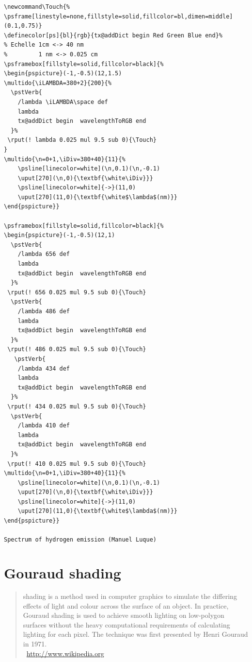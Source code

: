 \documentclass[11pt,english,BCOR=10mm,DIV=12,bibliography=totoc,parskip=false,headings=small,
    headinclude=false,footinclude=false,oneside]{pst-doc}
\begin{document}
\begin{lstlisting}
\newcommand\Touch{%
\psframe[linestyle=none,fillstyle=solid,fillcolor=bl,dimen=middle](0.1,0.75)}
\definecolor[ps]{bl}{rgb}{tx@addDict begin Red Green Blue end}%
% Echelle 1cm <-> 40 nm
%         1 nm <-> 0.025 cm
\psframebox[fillstyle=solid,fillcolor=black]{%
\begin{pspicture}(-1,-0.5)(12,1.5)
\multido{\iLAMBDA=380+2}{200}{%
  \pstVerb{
    /lambda \iLAMBDA\space def
    lambda
    tx@addDict begin  wavelengthToRGB end
  }%
 \rput(! lambda 0.025 mul 9.5 sub 0){\Touch}
}
\multido{\n=0+1,\iDiv=380+40}{11}{%
    \psline[linecolor=white](\n,0.1)(\n,-0.1)
    \uput[270](\n,0){\textbf{\white\iDiv}}}
    \psline[linecolor=white]{->}(11,0)
    \uput[270](11,0){\textbf{\white$\lambda$(nm)}}
\end{pspicture}}

\psframebox[fillstyle=solid,fillcolor=black]{%
\begin{pspicture}(-1,-0.5)(12,1)
  \pstVerb{
    /lambda 656 def
    lambda
    tx@addDict begin  wavelengthToRGB end
  }%
 \rput(! 656 0.025 mul 9.5 sub 0){\Touch}
  \pstVerb{
    /lambda 486 def
    lambda
    tx@addDict begin  wavelengthToRGB end
  }%
 \rput(! 486 0.025 mul 9.5 sub 0){\Touch}
   \pstVerb{
    /lambda 434 def
    lambda
    tx@addDict begin  wavelengthToRGB end
  }%
 \rput(! 434 0.025 mul 9.5 sub 0){\Touch}
  \pstVerb{
    /lambda 410 def
    lambda
    tx@addDict begin  wavelengthToRGB end
  }%
 \rput(! 410 0.025 mul 9.5 sub 0){\Touch}
\multido{\n=0+1,\iDiv=380+40}{11}{%
    \psline[linecolor=white](\n,0.1)(\n,-0.1)
    \uput[270](\n,0){\textbf{\white\iDiv}}}
    \psline[linecolor=white]{->}(11,0)
    \uput[270](11,0){\textbf{\white$\lambda$(nm)}}
\end{pspicture}}

Spectrum of hydrogen emission (Manuel Luque)
\end{lstlisting}





\section{Gouraud shading}
\begin{quotation}
 shading is a method used in computer graphics to simulate the differing effects of
light and colour across the surface of an object. In practice, Gouraud shading is used to
achieve smooth lighting on low-polygon surfaces without the heavy computational requirements
of calculating lighting for each pixel. The technique was first presented by Henri Gouraud in 1971.\\
~\hfill{\small \url{http://www.wikipedia.org}}
\end{quotation}
\end{document}
